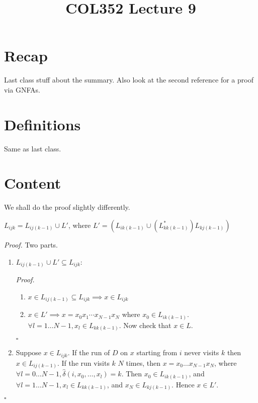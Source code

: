 \documentclass[a4paper]{article}
\title{\textbf{COL352 Lecture 9}}
\date{}
\newenvironment{proof}{\begin{breakbox}\textit{Proof.}}{\hfill$\square$\end{breakbox}}
\newcommand{\nl}{\vspace{0.2cm}\\}
\newcommand{\hd}{\hat{\delta}}
\begin{document}
\maketitle
\tableofcontents

\section{Recap}
Last class stuff about the summary. Also look at the second reference for a proof via GNFAs.
\section{Definitions}
Same as last class.
\section{Content}
We shall do the proof slightly differently.\nl
\begin{claim}
    $L_{ijk} = L_{ij(k-1)} \cup L'$, where $L' = \left(L_{ik(k-1)}\cup (L_{kk(k-1)}^*) L_{kj(k-1)}\right)$
\end{claim}
\begin{proof}
    Two parts.\nl
    \begin{enumerate}
        \item $L_{ij(k-1)} \cup L' \subseteq L_{ijk}$:
            \begin{proof}
                \begin{enumerate}
                    \item $x \in L_{ij(k-1)} \subseteq L_{ijk} \implies x \in L_{ijk}$
                    \item $x \in L' \implies x = x_0 x_1 \cdots x_{N-1} x_N$ where $x_0 \in L_{ik(k-1)}$. $\forall l = 1 \ldots N - 1, x_l \in L_{kk(k-1)}$. Now check that $x \in L$.
                \end{enumerate}
            \end{proof}
        \item Suppose $x \in L_{ijk}$. If the run of $D$ on $x$ starting from $i$ never visits $k$ then $x \in L_{ij(k-1)}$. If the run visits $k$ $N$ times, then $x = x_0 \ldots x_{N-1} x_N$,
            where $\forall l = 0 \ldots N - 1, \hd(i, x_0, \ldots, x_l) = k$. Then $x_0 \in L_{ik(k-1)}$, and $\forall l = 1 \ldots N - 1, x_l \in L_{kk(k-1)}$, and $x_N \in L_{kj(k-1)}$. Hence $x
            \in L'$.
    \end{enumerate}
\end{proof}
\end{document}
